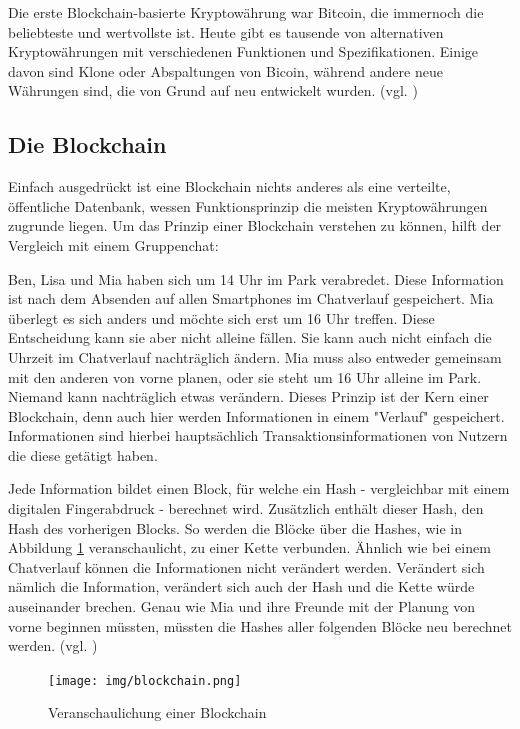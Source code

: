 \documentclass[oneside]{ausarbeitung}
\begin{document}
Die erste Blockchain-basierte Kryptowährung war Bitcoin, die
immernoch die beliebteste und wertvollste ist. Heute gibt es tausende
von alternativen Kryptowährungen mit verschiedenen Funktionen und
Spezifikationen. Einige davon sind Klone oder Abspaltungen von Bicoin,
während andere neue Währungen sind, die von Grund auf neu entwickelt
wurden. (vgl. \cite{cryptocurrency_explained})

\subsection{Die Blockchain}
\label{sub:blockchain}

Einfach ausgedrückt ist eine Blockchain nichts anderes als eine
verteilte, öffentliche Datenbank\cite{blockchain_definition}, wessen
Funktionsprinzip die meisten Kryptowährungen zugrunde
liegen\cite{blockchain_1}.
Um das Prinzip einer Blockchain verstehen zu können, hilft der
Vergleich mit einem Gruppenchat:

Ben, Lisa und Mia haben sich um 14 Uhr im Park verabredet. Diese
Information ist nach dem Absenden auf allen Smartphones im Chatverlauf
gespeichert. Mia überlegt es sich anders und möchte sich erst um 16
Uhr treffen. Diese Entscheidung kann sie aber nicht alleine fällen.
Sie kann auch nicht einfach die Uhrzeit im Chatverlauf nachträglich
ändern. Mia muss also entweder gemeinsam mit den anderen von vorne
planen, oder sie steht um 16 Uhr alleine im Park. Niemand kann
nachträglich etwas verändern. Dieses Prinzip ist der Kern einer
Blockchain, denn auch hier werden Informationen in einem "Verlauf"
gespeichert. Informationen sind hierbei hauptsächlich
Transaktionsinformationen von Nutzern die diese getätigt haben.

Jede Information bildet einen Block, für welche ein Hash -
vergleichbar mit einem digitalen Fingerabdruck - berechnet wird.
Zusätzlich enthält dieser Hash, den Hash des vorherigen Blocks. So
werden die Blöcke über die Hashes, wie in Abbildung \ref{fig:4}
veranschaulicht, zu einer Kette verbunden. Ähnlich wie bei einem
Chatverlauf können die Informationen nicht verändert werden.
Verändert sich nämlich die Information, verändert sich auch der
Hash und die Kette würde auseinander brechen. Genau wie Mia und ihre
Freunde mit der Planung von vorne beginnen müssten, müssten die
Hashes aller folgenden Blöcke neu berechnet werden. (vgl.
\cite{blockchain})

\begin{figure}[H]
  \centering
  \texttt{[image: img/blockchain.png]}
  \caption{Veranschaulichung einer Blockchain\cite{blockchain}}
  \label{fig:4}
\end{figure} 
\end{document}
